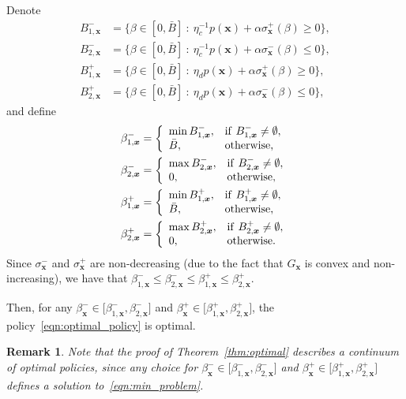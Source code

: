 \documentclass[journal]{IEEEtran}
\newcommand{\Bmax}{\bar{B}}
\newcommand{\bfx}{\boldsymbol x}
\newcommand{\sright}{\sigma_{\bfx}^+}
\newcommand{\sleft}{\sigma_{\bfx}^-}
\newcommand\1{\mathbf{1}}
\newtheorem{remark}{Remark}
\begin{document}
\begin{IEEEproof}
Denote
\begin{align}
\nonumber B_{1,\bfx}^- &= \{\beta \in [0,\Bmax]\ :\ \eta_c^{-1} p(\bfx) + \alpha \sright(\beta) \ge 0\},\\
\nonumber B_{2,\bfx}^- &= \{\beta \in [0,\Bmax]\ :\ \eta_c^{-1} p(\bfx) + \alpha \sleft(\beta) \le 0\},\\
\nonumber B_{1,\bfx}^+ &= \{\beta \in [0,\Bmax]\ :\ \eta_d p(\bfx) + \alpha \sright(\beta) \ge 0\},\\
B_{2,\bfx}^+ &= \{\beta \in [0,\Bmax]\ :\ \eta_d p(\bfx) + \alpha \sleft(\beta) \le 0\}, \label{eqn:sets}
\end{align}
and define
\begin{align*}
\beta_{1,\bfx}^- &= \left\{
\begin{array}{ll}
\min B_{1,\bfx}^-,   &   {\rm if~} B_{1,\bfx}^- \neq \emptyset,\\
\Bmax,   &   {\rm otherwise},
\end{array}
\right.
\\
\beta_{2,\bfx}^- &= \left\{
\begin{array}{ll}
\max B_{2,\bfx}^-,   &   {\rm if~} B_{2,\bfx}^- \neq \emptyset,\\
0,   &   {\rm otherwise},
\end{array}
\right.
\\
\beta_{1,\bfx}^+ &= \left\{
\begin{array}{ll}
\min B_{1,\bfx}^+,   &   {\rm if~} B_{1,\bfx}^+ \neq \emptyset,\\
\Bmax,   &   {\rm otherwise},
\end{array}
\right.
\\
\beta_{2,\bfx}^+ &= \left\{
\begin{array}{ll}
\max B_{2,\bfx}^+,   &   {\rm if~} B_{2,\bfx}^+ \neq \emptyset,\\
0,   &   {\rm otherwise}.
\end{array}
\right.
\end{align*}
Since $\sleft$ and $\sright$ are non-decreasing (due to the fact that $G_{\bfx}$ is convex and non-increasing), we have that $\beta_{1,\bfx}^- \le \beta_{2,\bfx}^- \le \beta_{1,\bfx}^+ \le \beta_{2,\bfx}^+$.

Then, for any $\beta_{\bfx}^- \in \lbrack \beta_{1,\bfx}^-,\beta_{2,\bfx}^-\rbrack$ and $\beta_{\bfx}^+ \in \lbrack \beta_{1,\bfx}^+,\beta_{2,\bfx}^+\rbrack$, the policy~\eqref{eqn:optimal_policy} is optimal.
\end{IEEEproof}

\begin{remark}
Note that the proof of Theorem~\ref{thm:optimal} describes a continuum of optimal policies, since any choice for $\beta_{\bfx}^- \in \lbrack \beta_{1,\bfx}^-,\beta_{2,\bfx}^-\rbrack$ and $\beta_{\bfx}^+ \in \lbrack \beta_{1,\bfx}^+,\beta_{2,\bfx}^+\rbrack$ defines a solution to~\eqref{eqn:min_problem}.
\end{remark}
\end{document}
